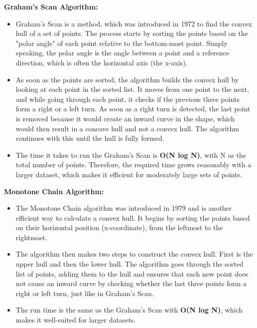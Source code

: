     \textbf{Graham's Scan Algorithm:} 
    \begin{itemize}
        \item Graham's Scan is a method, which was introduced in 1972 to find the convex hull of a set of points. The process starts by sorting the points based on the "polar angle" of each point relative to the bottom-most point. Simply speaking, the polar angle is the angle between a point and a reference direction, which is often the horizontal axis (the x-axis).
        \item As soon as the points are sorted, the algorithm builds the convex hull by looking at each point in the sorted list. It moves from one point to the next, and while going through each point, it checks if the previous three points form a right or a left turn. As soon as a right turn is detected, the last point is removed because it would create an inward curve in the shape, which would then result in a concave hull and not a convex hull. The algorithm continues with this until the hull is fully formed.
        \item The time it takes to run the Graham's Scan is \textbf{O(N log N)}, with N as the total number of points. Therefore, the required time grows reasonably with a larger dataset, which makes it efficient for moderately large sets of points.
    \end{itemize} 
    \autocite{Andi:typesOfConvexHullAlgos, Andi:convexHullPic} \newline \newline
    \textbf{Monotone Chain Algorithm:}
    \begin{itemize}
        \item The Monotone Chain algorithm was introduced in 1979 and is another efficient way to calculate a convex hull. It begins by sorting the points based on their horizontal position (x-coordinate), from the leftmost to the rightmost.
        \item The algorithm then makes two steps to construct the convex hull. First is the upper hull and then the lower hull. The algorithm goes through the sorted list of points, adding them to the hull and ensures that each new point does not cause an inward curve by checking whether the last three points form a right or left turn, just like in Graham's Scan.
        \item The run time is the same as the Graham's Scan with \textbf{O(N log N)}, which makes it well-suited for larger datasets.
    \end{itemize} \autocite{Andi:typesOfConvexHullAlgos, Andi:convexHullPic}

